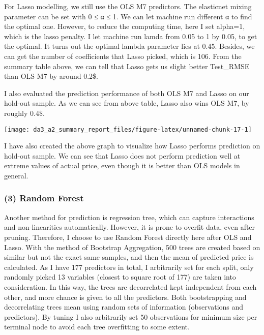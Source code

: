 \documentclass[
]{article}
\begin{document}
For Lasso modelling, we still use the OLS M7 predictors. The elasticnet
mixing parameter can be set with 0 ≤ α ≤ 1. We can let machine run
different α to find the optimal one. However, to reduce the computing
time, here I set alpha=1, which is the lasso penalty. I let machine run
lamda from 0.05 to 1 by 0.05, to get the optimal. It turns out the
optimal lambda parameter lies at 0.45. Besides, we can get the number of
coefficients that Lasso picked, which is 106. From the summary table
above, we can tell that Lasso gets us slight better Test\_RMSE than OLS
M7 by around 0.2\$.

\begin{table}[!h]
\centering
{}
\end{table}

I also evaluated the prediction performance of both OLS M7 and Lasso on
our hold-out sample. As we can see from above table, Lasso also wins OLS
M7, by roughly 0.4\$.

\begin{center}\texttt{[image: da3\_a2\_summary\_report\_files/figure-latex/unnamed-chunk-17-1]} \end{center}

I have also created the above graph to visualize how Lasso performs
prediction on hold-out sample. We can see that Lasso does not perform
prediction well at extreme values of actual price, even though it is
better than OLS models in general.

\hypertarget{random-forest}{%
\subsubsection{(3) Random Forest}\label{random-forest}}

Another method for prediction is regression tree, which can capture
interactions and non-linearities automatically. However, it is prone to
overfit data, even after pruning. Therefore, I choose to use Random
Forest directly here after OLS and Lasso. With the method of Bootstrap
Aggregation, 500 trees are created based on similar but not the exact
same samples, and then the mean of predicted price is calculated. As I
have 177 predictors in total, I arbitrarily set for each split, only
randomly picked 13 variables (closest to square root of 177) are taken
into consideration. In this way, the trees are decorrelated kept
independent from each other, and more chance is given to all the
predictors. Both bootstrapping and decorrelating trees mean using random
sets of information (observations and predictors). By tuning I also
arbitrarily set 50 observations for minimum size per terminal node to
avoid each tree overfitting to some extent.
\end{document}
